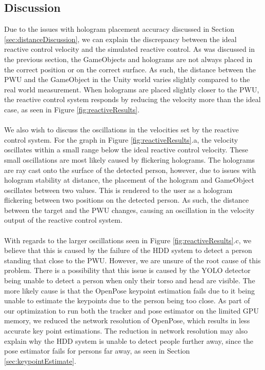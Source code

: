 \newpage

\subsection{Discussion} \label{sec:gazeboDiscussion}
Due to the issues with hologram placement accuracy discussed in Section \ref{sec:distanceDiscussion}, we can explain the discrepancy between the ideal reactive control velocity and the simulated reactive control. As was discussed in the previous section, the GameObjects and holograms are not always placed in the correct position or on the correct surface. As such, the distance between the PWU and the GameObject in the Unity world varies slightly compared to the real world measurement. When holograms are placed slightly closer to the PWU, the reactive control system responds by reducing the velocity more than the ideal case, as seen in Figure \ref{fig:reactiveResults}.

\paragraph{}We also wish to discuss the oscillations in the velocities set by the reactive control system. For the graph in Figure \ref{fig:reactiveResults}.a, the velocity oscillates within a small range below the ideal reactive control velocity. These small oscillations are most likely caused by flickering holograms. The holograms are ray cast onto the surface of the detected person, however, due to issues with hologram stability at distance, the placement of the hologram and GameObject oscillates between two values. This is rendered to the user as a hologram flickering between two positions on the detected person. As such, the distance between the target and the PWU changes, causing an oscillation in the velocity output of the reactive control system. 

\paragraph{}With regards to the larger oscillations seen in Figure \ref{fig:reactiveResults}.c, we believe that this is caused by the failure of the HDD system to detect a person standing that close to the PWU. However, we are unsure of the root cause of this problem. There is a possibility that this issue is caused by the YOLO detector being unable to detect a person when only their torso and head are visible. The more likely cause is that the OpenPose keypoint estimation fails due to it being unable to estimate the keypoints due to the person being too close. As part of our optimization to run both the tracker and pose estimator on the limited GPU memory, we reduced the network resolution of OpenPose, which results in less accurate key point estimations. The reduction in network resolution may also explain why the HDD system is unable to detect people further away, since the pose estimator fails for persons far away, as seen in Section \ref{sec:keypointEstimate}.

